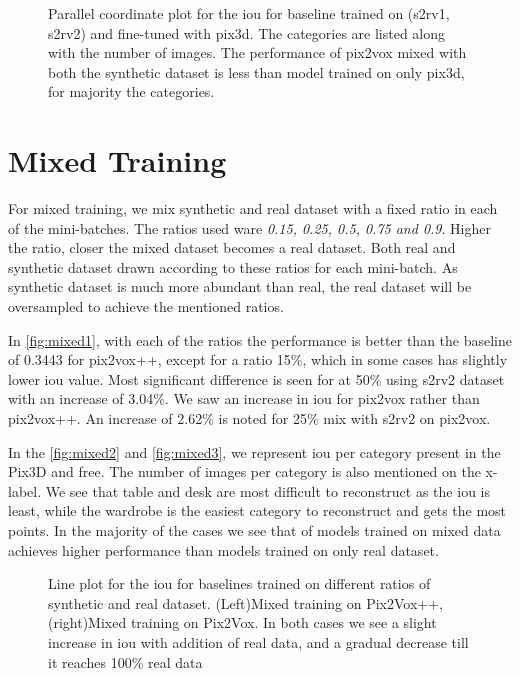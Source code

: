 \begin{figure}
    \centering
    \resizebox{0.75\textwidth}{!}{}
    \caption{Parallel coordinate plot for the \gls{iou} for baseline  trained on (\gls{s2rv1}, \gls{s2rv2}) and fine-tuned with pix3d.
    The categories are listed along with the number of images.
    The performance of pix2vox mixed with both the synthetic dataset is less than model trained on only pix3d, for majority the categories.}
    \label{fig:finetuning3}
\end{figure}


\section{Mixed Training}\label{sec:mixed-training}
For mixed training, we mix synthetic and real dataset with a fixed ratio in each of the mini-batches.
The ratios used ware \emph{0.15, 0.25, 0.5, 0.75 and 0.9}.
Higher the ratio, closer the mixed dataset becomes a real dataset.
Both real and synthetic dataset drawn according to these ratios for each mini-batch.
As synthetic dataset is much more abundant than real, the real dataset will be oversampled to achieve the mentioned ratios.

In \autoref{fig:mixed1}, with each of the ratios the performance is better than the baseline of 0.3443 for pix2vox++,
except for a ratio 15\%, which in some cases has slightly lower \gls{iou}  value.
Most significant difference is seen for at 50\% using \gls{s2rv2} dataset with an increase of 3.04\%.
We saw an increase in \gls{iou} for pix2vox rather than pix2vox++.
An increase of 2.62\% is noted for 25\% mix with \gls{s2rv2} on pix2vox.

In the \autoref{fig:mixed2} and \autoref{fig:mixed3}, we represent \gls{iou} per category present in the Pix3D and \gls{free}.
The number of images per category is also mentioned on the x-label.
We see that table and desk are most difficult to reconstruct as the \gls{iou} is least, while the wardrobe is the easiest category to reconstruct and gets the most points.
In the majority of the cases we see that  of models trained on mixed data achieves higher performance than models trained on only real dataset.

\begin{figure}
    \centering
    \resizebox{0.49\linewidth}{!}{}
    \resizebox{0.49\linewidth}{!}{}
    \caption{Line plot for the \gls{iou}  for baselines trained on different ratios of synthetic and real dataset.
        (Left)Mixed training on Pix2Vox++, (right)Mixed training on Pix2Vox. In both cases we see a slight increase in \gls{iou} with addition of real data, and a gradual decrease till it reaches 100\% real data}
    \label{fig:mixed1}
\end{figure}


